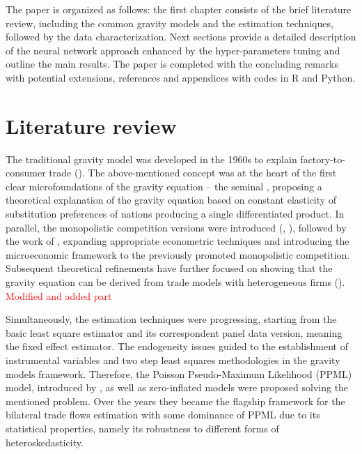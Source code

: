 \documentclass{Trade_template}
\numberwithin{equation}{section}
\begin{document}
The paper is organized as follows: the first chapter consists of the brief literature review, including the common gravity models and the estimation techniques, followed by the data characterization. Next sections provide a detailed description of the neural network approach enhanced by the hyper-parameters tuning and outline the main results. The paper is completed with the concluding remarks with potential extensions, references and appendices with codes in R and Python.

\chapter{Literature review}

The traditional gravity model was developed in the 1960s to explain factory-to-consumer trade (\citet{tinbergen1962analysis}). The above-mentioned concept was at the heart of the first clear microfoundations of the gravity equation – the seminal \citet{anderson1979theoretical}, proposing a theoretical explanation of the gravity equation based on constant elasticity of substitution preferences of nations producing a single differentiated product. In parallel, the monopolistic competition versions were introduced (\citet{krugman1980scale}, \citet{bergstrand1985gravity}), followed by the work of \citet{anderson2003gravity}, expanding appropriate econometric techniques and introducing the microeconomic framework to the previously promoted monopolistic competition. Subsequent theoretical refinements have further focused on showing that the gravity equation can be derived from trade models with heterogeneous firms (\citet{helpman2008estimating}).
\textcolor{red}{Modified and added part}

\text

Simultaneously, the estimation techniques were progressing, starting from the basic least square estimator and its correspondent panel data version, meaning the fixed effect estimator. The endogeneity issues guided to the establishment of instrumental variables and two step least squares methodologies in the gravity models framework. Therefore, the Poisson Pseudo-Maximum Likelihood (PPML) model, introduced by \citet{santos2006ppml}, as well as zero-inﬂated models were proposed solving the mentioned problem. Over the years they became the ﬂagship framework for the bilateral trade ﬂows estimation with some dominance of PPML due to its statistical properties, namely its robustness to different forms of heteroskedasticity.
\end{document}
